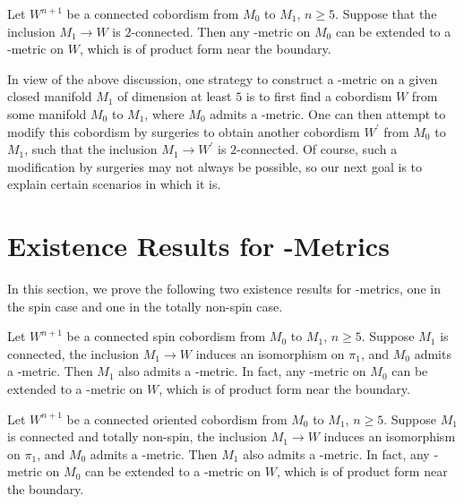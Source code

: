 \begin{theorem}
    \label{psc:thm:extending_psc_to_cobordism}
    Let $W^{n+1}$ be a connected cobordism from $M_0$ to $M_1$, $n\geq5$. Suppose that the inclusion $M_1 \to W$ is $2$-connected. Then any \psc-metric on $M_0$ can be extended to a \psc-metric on $W$, which is of product form near the boundary.
\end{theorem}

In view of the above discussion, one strategy to construct a \psc-metric on a given closed manifold $M_1$ of dimension at least $5$ is to first find a cobordism $W$ from some manifold $M_0$ to $M_1$, where $M_0$ admits a \psc-metric. One can then attempt to modify this cobordism by surgeries to obtain another cobordism $W^\prime$ from $M_0$ to $M_1$, such that the inclusion $M_1 \to W^\prime$ is $2$-connected. Of course, such a modification by surgeries may not always be possible, so our next goal is to explain certain scenarios in which it is.

\section{Existence Results for \psc-Metrics}

In this section, we prove the following two existence results for \psc-metrics, one in the spin case and one in the totally non-spin case.

\begin{theorem}
    \label{psc:thm:existence_result_spin}
    Let $W^{n+1}$ be a connected spin cobordism from $M_0$ to $M_1$, $n \geq 5$. Suppose $M_1$ is connected, the inclusion $M_1 \to W$ induces an isomorphism on $\pi_1$, and $M_0$ admits a \psc-metric. Then $M_1$ also admits a \psc-metric. In fact, any \psc-metric on $M_0$ can be extended to a \psc-metric on $W$, which is of product form near the boundary. 
\end{theorem}

\begin{theorem}
    \label{psc:thm:existence_result_totally_non_spin}
    Let $W^{n+1}$ be a connected oriented cobordism from $M_0$ to $M_1$, $n \geq 5$. Suppose $M_1$ is connected and totally non-spin, the inclusion $M_1 \to W$ induces an isomorphism on $\pi_1$, and $M_0$ admits a \psc-metric. Then $M_1$ also admits a \psc-metric. In fact, any \psc-metric on $M_0$ can be extended to a \psc-metric on $W$, which is of product form near the boundary. 
\end{theorem}

